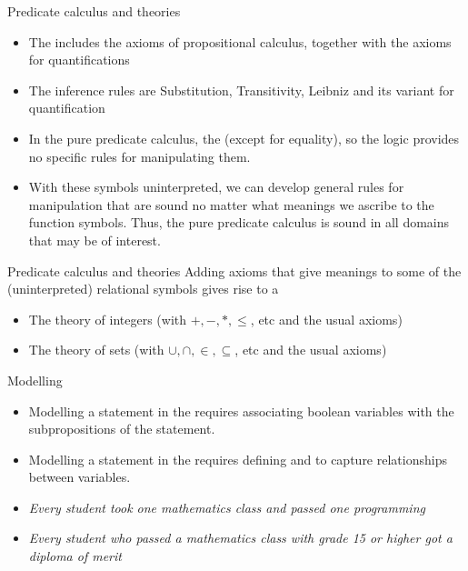 \documentclass{beamer}
\begin{document}
\begin{slide}{Predicate calculus and theories}
\begin{itemize}
\item The  includes the axioms of propositional calculus, together with the axioms for quantifications 
\item The inference rules  are Substitution, Transitivity, Leibniz and its variant for quantification 
\item In the pure predicate calculus, the  (except for equality), so the logic provides no specific rules for manipulating them. 
\item With these symbols uninterpreted, we can develop general rules for manipulation that are sound no matter what meanings we ascribe to the function symbols. Thus, the pure predicate calculus is sound in all domains that may be of interest.
\end{itemize}
\end{slide}

\begin{slide}{Predicate calculus and theories}
Adding axioms that give meanings to some of the (uninterpreted) relational symbols gives rise to a  

\begin{itemize}
\item The theory of integers (with $+,-,*, \leq$, etc and the usual axioms)
\item The theory of sets (with $\cup, \cap, \in, \subseteq$, etc and the usual axioms)
\end{itemize}
\end{slide}


\begin{slide}{Modelling}
\begin{itemize}
\item Modelling a statement in the  requires associating boolean variables with the subpropositions of the statement. 
\item Modelling a statement in the  requires defining  and  to capture relationships between variables.
\end{itemize}

\begin{itemize}
\item \emph{Every student took one mathematics class and passed one programming}
\item \emph{Every student who passed a mathematics class with grade 15 or higher got a diploma of merit}
\end{itemize}

\end{slide}
\end{document}
